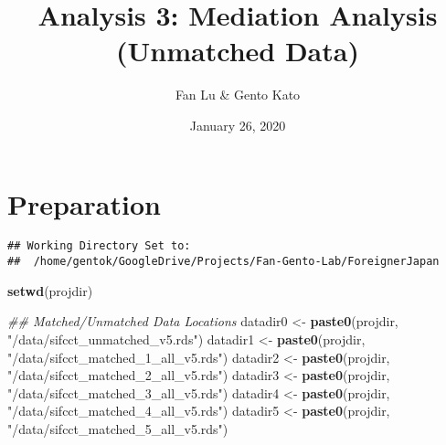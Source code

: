 \documentclass[
]{article}
\title{Analysis 3: Mediation Analysis (Unmatched Data)}
\author{Fan Lu \& Gento Kato}
\date{January 26, 2020}
\newenvironment{Shaded}{\begin{snugshade}}{\end{snugshade}}
\newcommand{\CharTok}[1]{\textcolor[rgb]{0.31,0.60,0.02}{#1}}
\newcommand{\CommentTok}[1]{\textcolor[rgb]{0.56,0.35,0.01}{\textit{#1}}}
\newcommand{\ControlFlowTok}[1]{\textcolor[rgb]{0.13,0.29,0.53}{\textbf{#1}}}
\newcommand{\DataTypeTok}[1]{\textcolor[rgb]{0.13,0.29,0.53}{#1}}
\newcommand{\KeywordTok}[1]{\textcolor[rgb]{0.13,0.29,0.53}{\textbf{#1}}}
\newcommand{\NormalTok}[1]{#1}
\newcommand{\OperatorTok}[1]{\textcolor[rgb]{0.81,0.36,0.00}{\textbf{#1}}}
\newcommand{\OtherTok}[1]{\textcolor[rgb]{0.56,0.35,0.01}{#1}}
\newcommand{\StringTok}[1]{\textcolor[rgb]{0.31,0.60,0.02}{#1}}
\begin{document}
\maketitle

\hypertarget{preparation}{%
\section{Preparation}\label{preparation}}

\begin{Shaded}
\end{Shaded}

\begin{verbatim}
## Working Directory Set to:
##  /home/gentok/GoogleDrive/Projects/Fan-Gento-Lab/ForeignerJapan
\end{verbatim}

\begin{Shaded}
\begin{Highlighting}[]
\KeywordTok{setwd}\NormalTok{(projdir)}

\CommentTok{## Matched/Unmatched Data Locations}
\NormalTok{datadir0 <-}\StringTok{ }\KeywordTok{paste0}\NormalTok{(projdir, }\StringTok{"/data/sifcct_unmatched_v5.rds"}\NormalTok{)}
\NormalTok{datadir1 <-}\StringTok{ }\KeywordTok{paste0}\NormalTok{(projdir, }\StringTok{"/data/sifcct_matched_1_all_v5.rds"}\NormalTok{)}
\NormalTok{datadir2 <-}\StringTok{ }\KeywordTok{paste0}\NormalTok{(projdir, }\StringTok{"/data/sifcct_matched_2_all_v5.rds"}\NormalTok{)}
\NormalTok{datadir3 <-}\StringTok{ }\KeywordTok{paste0}\NormalTok{(projdir, }\StringTok{"/data/sifcct_matched_3_all_v5.rds"}\NormalTok{)}
\NormalTok{datadir4 <-}\StringTok{ }\KeywordTok{paste0}\NormalTok{(projdir, }\StringTok{"/data/sifcct_matched_4_all_v5.rds"}\NormalTok{)}
\NormalTok{datadir5 <-}\StringTok{ }\KeywordTok{paste0}\NormalTok{(projdir, }\StringTok{"/data/sifcct_matched_5_all_v5.rds"}\NormalTok{)}
\end{Highlighting}
\end{Shaded}
\end{document}
